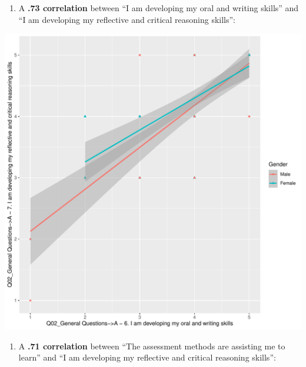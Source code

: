 \documentclass[
]{article}
\providecommand{\tightlist}{%
  \setlength{\itemsep}{0pt}\setlength{\parskip}{0pt}}
\begin{document}
\begin{enumerate}
\def\labelenumi{(\arabic{enumi})}
\tightlist
\item
  A \textbf{.73 correlation} between ``I am developing my oral and
  writing skills'' and ``I am developing my reflective and critical
  reasoning skills'':
\end{enumerate}

\includegraphics{AnalysisOfCourseEvaluation-Notebook_files/figure-latex/DrillDownCorr1-1.pdf}

\begin{enumerate}
\def\labelenumi{(\arabic{enumi})}
\setcounter{enumi}{1}
\tightlist
\item
  A \textbf{.71 correlation} between ``The assessment methods are
  assisting me to learn'' and ``I am developing my reflective and
  critical reasoning skills'':
\end{enumerate}
\end{document}
